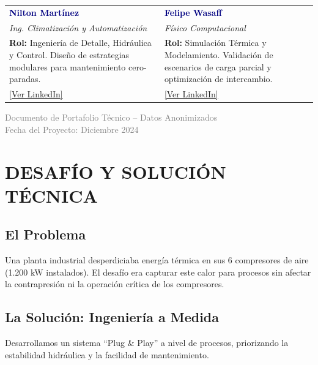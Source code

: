 \documentclass[11pt,letterpaper]{article}
\begin{document}
\vspace{0.5cm}

\begin{tabular}{p{} | p{}}
    \textbf{\textcolor{navy}{Nilton Martínez}} & \textbf{\textcolor{navy}{Felipe Wasaff}} \\
    \textit{Ing. Climatización y Automatización} & \textit{Físico Computacional} \\
    \footnotesize
    \textbf{Rol:} Ingeniería de Detalle, Hidráulica y Control. Diseño de estrategias modulares para mantenimiento cero-paradas. & 
    \footnotesize
    \textbf{Rol:} Simulación Térmica y Modelamiento. Validación de escenarios de carga parcial y optimización de intercambio. \\
    \href{https://www.linkedin.com/in/nilton-martinez-a0168131/}{[Ver LinkedIn]} & \href{https://www.linkedin.com/in/felipewasaff/}{[Ver LinkedIn]} \\
\end{tabular}

\vfill
\begin{center}
    \small\textcolor{gray}{Documento de Portafolio Técnico -- Datos Anonimizados\\
    Fecha del Proyecto: Diciembre 2024}
\end{center}

\newpage


\section{DESAFÍO Y SOLUCIÓN TÉCNICA}

\subsection{El Problema}
Una planta industrial desperdiciaba energía térmica en sus 6 compresores de aire (1.200 kW instalados). El desafío era capturar este calor para procesos sin afectar la contrapresión ni la operación crítica de los compresores.

\subsection{La Solución: Ingeniería a Medida}
Desarrollamos un sistema ``Plug \& Play'' a nivel de procesos, priorizando la estabilidad hidráulica y la facilidad de mantenimiento.
\end{document}
